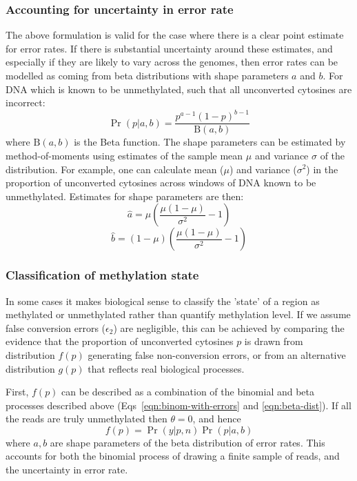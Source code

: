 \documentclass[10pt,letterpaper,draft]{article}
\begin{document}
\subsubsection*{Accounting for uncertainty in error rate} \label{sec:mean-as-beta}

The above formulation is valid for the case where there is a clear point estimate for error rates.
If there is substantial uncertainty around these estimates, and especially if they are likely to vary across the genomes, then error rates can be modelled as coming from beta distributions with shape parameters $a$ and $b$. For DNA which is known to be unmethylated, such that all unconverted cytosines are incorrect:
\begin{equation}
    \label{eqn:beta-dist}
    \Pr(p|a,b) = \frac{p^{a-1} (1-p)^{b-1}}{\textrm{B}(a,b)}
\end{equation}
where $\textrm{B}(a,b)$ is the Beta function.
The shape parameters can be estimated by method-of-moments using estimates of the sample mean $\mu$ and variance $\sigma$ of the distribution.
For example, one can calculate mean ($\mu$) and variance ($\sigma^2$) in the proportion of unconverted cytosines across windows of DNA known to be unmethylated.
Estimates for shape parameters are then:
\begin{equation}
    \hat{a} = \mu(\frac{\mu(1-\mu)}{\sigma^2}-1)
    \label{eqn:beta-a}
\end{equation}
\begin{equation}
    \hat{b} = (1-\mu)(\frac{\mu(1-\mu)}{\sigma^2}-1) 
    \label{eqn:beta-b}
\end{equation}

\subsubsection*{Classification of methylation state} \label{sec:meth-state}

In some cases it makes biological sense to classify the 'state' of a region as methylated or unmethylated rather than quantify methylation level.
If we assume false conversion errors ($\epsilon_2$) are negligible, this can be achieved by comparing the evidence that the proportion of unconverted cytosines $p$ is drawn from distribution $f(p)$ generating false non-conversion errors, or from an alternative distribution $g(p)$ that reflects real biological processes.

First, $f(p)$ can be described as a combination of the binomial and beta processes described above (Eqs~\ref{eqn:binom-with-errors} and \ref{eqn:beta-dist}).
If all the reads are truly unmethylated then $\theta=0$, and hence
\begin{equation}
    f(p) = \Pr(y | p, n) \Pr(p | a, b)
    \label{eqn:f-of-p}
\end{equation}
where $a, b$ are shape parameters of the beta distribution of error rates.
This accounts for both the binomial process of drawing a finite sample of reads, and the uncertainty in error rate.
\end{document}
